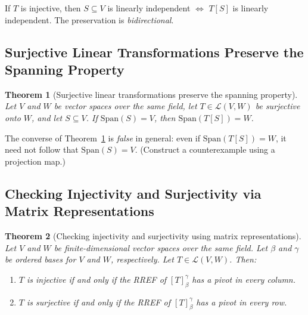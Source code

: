 \documentclass[11pt, a4paper, notitlepage]{report}
\newtheorem{theorem}{Theorem}[section]
\theoremstyle{definition}
\theoremstyle{remark}
\begin{document}
\begin{keyresult}[title={Key Result: Injective Maps Preserve Linear Independence Both Ways}]
If $T$ is injective, then $S \subseteq V$ is linearly independent $\iff$ $T[S]$ is linearly
independent.  The preservation is \emph{bidirectional}.
\end{keyresult}

\subsection{Surjective Linear Transformations Preserve the Spanning Property}

\begin{theorem}[Surjective linear transformations preserve the spanning property]
\label{thm:surjective-spanning}
Let $V$ and $W$ be vector spaces over the same field, let $T \in \mathcal{L}(V,W)$ be
surjective onto $W$, and let $S \subseteq V$.  If $\mathrm{Span}(S) = V$, then
$\mathrm{Span}(T[S]) = W$.
\end{theorem}

\begin{warning}[title={Warning: Spanning is Not Preserved Backwards}]
The converse of Theorem~\ref{thm:surjective-spanning} is \emph{false} in general: even if
$\mathrm{Span}(T[S]) = W$, it need not follow that $\mathrm{Span}(S) = V$.  (Construct a
counterexample using a projection map.)
\end{warning}

\subsection{Checking Injectivity and Surjectivity via Matrix Representations}

\begin{theorem}[Checking injectivity and surjectivity using matrix representations]
\label{thm:injectivity-surjectivity-matrix}
Let $V$ and $W$ be finite-dimensional vector spaces over the same field.  Let $\beta$ and
$\gamma$ be ordered bases for $V$ and $W$, respectively.  Let $T \in \mathcal{L}(V,W)$.  Then:
\begin{enumerate}
  \item $T$ is injective if and only if the RREF of $[T]_\beta^\gamma$ has a pivot in every
        \emph{column}.
  \item $T$ is surjective if and only if the RREF of $[T]_\beta^\gamma$ has a pivot in every
        \emph{row}.
\end{enumerate}
\end{theorem}
\end{document}
